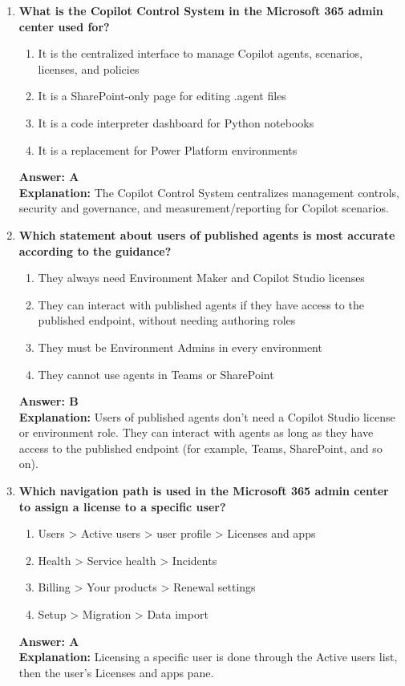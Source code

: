 \documentclass[10pt]{article}
\begin{document}
\begin{enumerate}[leftmargin=*]
\item \textbf{What is the Copilot Control System in the Microsoft 365 admin center used for?}
\begin{enumerate}[label=\Alph*.]
  \item It is the centralized interface to manage Copilot agents, scenarios, licenses, and policies
  \item It is a SharePoint-only page for editing .agent files
  \item It is a code interpreter dashboard for Python notebooks
  \item It is a replacement for Power Platform environments
\end{enumerate}
\textbf{Answer: A}\\
\textbf{Explanation:} The Copilot Control System centralizes management controls, security and governance, and measurement/reporting for Copilot scenarios.

\item \textbf{Which statement about users of published agents is most accurate according to the guidance?}
\begin{enumerate}[label=\Alph*.]
  \item They always need Environment Maker and Copilot Studio licenses
  \item They can interact with published agents if they have access to the published endpoint, without needing authoring roles
  \item They must be Environment Admins in every environment
  \item They cannot use agents in Teams or SharePoint
\end{enumerate}
\textbf{Answer: B}\\
\textbf{Explanation:} Users of published agents don’t need a Copilot Studio license or environment role. They can interact with agents as long as they have access to the published endpoint (for example, Teams, SharePoint, and so on).

\item \textbf{Which navigation path is used in the Microsoft 365 admin center to assign a license to a specific user?}
\begin{enumerate}[label=\Alph*.]
  \item Users > Active users > user profile > Licenses and apps
  \item Health > Service health > Incidents
  \item Billing > Your products > Renewal settings
  \item Setup > Migration > Data import
\end{enumerate}
\textbf{Answer: A}\\
\textbf{Explanation:} Licensing a specific user is done through the Active users list, then the user's Licenses and apps pane.


\end{enumerate}
\end{document}
